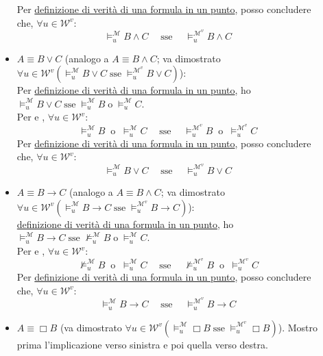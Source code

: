 \documentclass[a4paper,12pt]{article}
\newcommand{\latinmath}[1]{\text{\latinmodern{#1}}} %
\begin{document}
\begin{dimo}
\begin{description}
\begin{itemize}
			Per \hyperlink{defverp}{definizione di verità di una formula in un punto}, posso concludere che, $\forall u \in \mathcal{W}^{v}$:
			$$\vDash_u^{\mathcal{M}} B \land C \quad \; \text{sse} \quad \; \vDash_u^{\mathcal{M}^{v}} B \land C$$
			\item $A \equiv B \lor C$ (analogo a $A \equiv B \land C$; va dimostrato \emph{$\forall u \in \mathcal{W}^{v} (\vDash_u^{\mathcal{M}} B \lor C \; \text{sse} \; \vDash_u^{\mathcal{M}^{v}} B \lor C)$}):\\
			Per \hyperlink{defverp}{definizione di verità di una formula in un punto}, ho $\vDash_u^{\mathcal{M}} B \lor C \; \text{sse} \; \vDash_u^{\mathcal{M}} B \; \text{o} \; \vDash_u^{\mathcal{M}} C$. \\
			Per \latinmath{IH1} e \latinmath{IH2}, $\forall u \in \mathcal{W}^{v}$:
			$$\vDash_u^{\mathcal{M}} B \;\; \text{o} \;\; \vDash_u^{\mathcal{M}} C \quad \; \text{sse} \quad \; \vDash_u^{\mathcal{M}^{v}} B \;\; \text{o} \;\; \vDash_u^{\mathcal{M}^{v}} C$$ 
			Per \hyperlink{defverp}{definizione di verità di una formula in un punto}, posso concludere che, $\forall u \in \mathcal{W}^{v}$:
			$$\vDash_u^{\mathcal{M}} B \lor C \quad \; \text{sse} \quad \; \vDash_u^{\mathcal{M}^{v}} B \lor C$$
			\item $A \equiv B \to C$ (analogo a $A \equiv B \land C$; va dimostrato \emph{$\forall u \in \mathcal{W}^{v} (\vDash_u^{\mathcal{M}} B \to C \; \text{sse} \; \vDash_u^{\mathcal{M}^{v}} B \to C)$}):\\
			\hyperlink{defverp}{definizione di verità di una formula in un punto}, ho $\vDash_u^{\mathcal{M}} B \to C \; \text{sse} \; \nvDash_u^{\mathcal{M}} B \; \text{o} \; \vDash_u^{\mathcal{M}} C$. \\
			Per \latinmath{IH1} e \latinmath{IH2}, $\forall u \in \mathcal{W}^{v}$:
			$$\nvDash_u^{\mathcal{M}} B \;\; \text{o} \;\; \vDash_u^{\mathcal{M}} C \quad \; \text{sse} \quad \; \nvDash_u^{\mathcal{M}^{v}} B \;\; \text{o} \;\; \vDash_u^{\mathcal{M}^{v}} C$$ 
			Per \hyperlink{defverp}{definizione di verità di una formula in un punto}, posso concludere che, $\forall u \in \mathcal{W}^{v}$:
			$$\vDash_u^{\mathcal{M}} B \to C \quad \; \text{sse} \quad \; \vDash_u^{\mathcal{M}^{v}} B \to C$$
			\item $A \equiv \Box B$ (va dimostrato \emph{$\forall u \in \mathcal{W}^{v} (\vDash_u^{\mathcal{M}} \Box B \; \text{sse} \; \vDash_u^{\mathcal{M}^{v}} \Box B)$}). Mostro prima l'implicazione verso sinistra e poi quella verso destra. 
			\begin{enumerate}

\end{enumerate}
\end{itemize}
\end{description}
\end{dimo}
\end{document}

